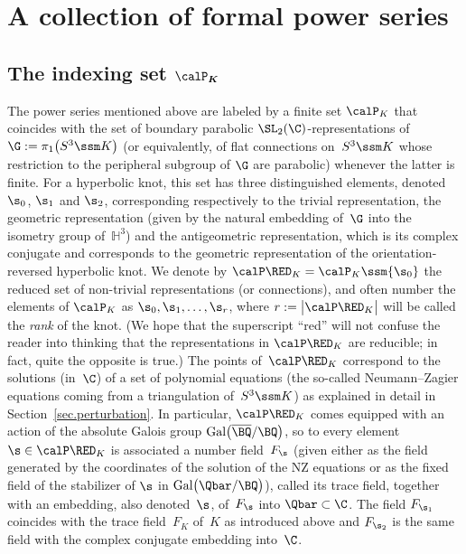 \section{A collection of formal power series}
\label{sec.Phi}

\subsection[The indexing set P\_K]{The indexing set $\boldsymbol{\calP_K}$}
\label{sub.p}

The power series mentioned above are labeled by a finite set $\calP_K$
that coincides with the set of boundary parabolic $\SL_2(\C)$-representations
of $\G:=\pi_1\big(S^3\ssm K\big)$ (or equivalently, of flat connections
on~$S^3\ssm K$ whose restriction to the peripheral subgroup of $\G$ are
parabolic) whenever the latter is finite. For a hyperbolic knot, this
set has three distinguished elements, denoted $\s_0$, $\s_1$ and $\s_2$,
corresponding respectively to the trivial representation, the geometric
representation (given by the natural embedding of~$\G$ into the isometry group
of~$\mathbb H^3$) and the antigeometric representation, which is its
complex conjugate and corresponds to the geometric representation of the
orientation-reversed hyperbolic knot. We denote by $\calP\RED_K=\calP_K\ssm\{\s_0\}$
the reduced set of non-trivial representations (or connections), and often
number the elements of $\calP_K$ as $\s_0,\s_1,\dots,\s_r$, where
$r:=\big|\calP\RED_K\big|$ will be called the \emph{rank} of the knot. (We hope that the
superscript ``red'' will not confuse the reader into thinking that the representations
in $\calP\RED_K$ are reducible; in fact, quite the opposite is true.)
The points of~$\calP\RED_K$ correspond to the solutions (in~$\C$) of a set of polynomial
equations \big(the so-called Neumann--Zagier equations coming from a triangulation
of~$S^3\ssm K$\big) as explained in detail in Section~\ref{sec.perturbation}.
In particular, $\calP\RED_K$ comes equipped with an action of the absolute
Galois group $\text{Gal}\big(\overline{\BQ}/\BQ\big)$, so to every element
$\s \in \calP\RED_K$ is associated a number field~$F_\s$ \big(given either as the
field generated by the coordinates of the solution of the NZ equations or
as the fixed field of the stabilizer of $\s$ in $\text{Gal}\big(\Qbar/\BQ\big)$\big),
called its trace field, together with an embedding, also denoted~$\s$,
of~$F_\s$ into $\Qbar\subset\C$. The field $F_{\s_1}$
coincides with the trace field~$F_K$ of~$K$ as introduced above and
$F_{\s_2}$ is the same field with the complex conjugate embedding into~$\C$.
